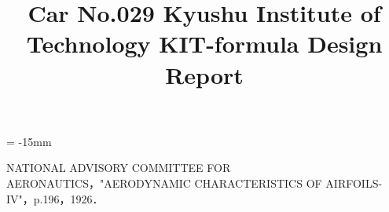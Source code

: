 \documentclass[10pt]{jarticle}
\begin{document}
\footnotesize %



\date{\vspace{-15mm}}
\title{\vspace{-18mm} \small Car No.029 Kyushu Institute of Technology KIT-formula Design Report}

\oddsidemargin = -15mm
\maketitle %
\thispagestyle{empty}





\begin{multicols}{2}










\begin{thebibliography}{99}
 NATIONAL ADVISORY COMMITTEE FOR AERONAUTICS，"AERODYNAMIC CHARACTERISTICS OF AIRFOILS-IV"，p.196，1926．
\end{thebibliography}

\end{multicols}
\end{document}

